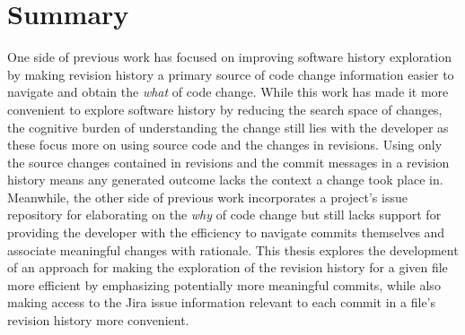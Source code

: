 \section{Summary}

One side of previous work has focused on improving software history exploration by making revision history a primary source of code change information easier to navigate and obtain the \emph{what} of code change.
While this work has made it more convenient to explore software history by reducing the search space of changes, the cognitive burden of understanding the change still lies with the developer as these focus more on using source code and the changes in revisions.
Using only the source changes contained in revisions and the commit messages in a revision history means any generated outcome lacks the context a change took place in.
Meanwhile, the other side of previous work incorporates a project's issue repository for elaborating on the \emph{why} of code change but still lacks support for providing the developer with the efficiency to navigate commits themselves and associate meaningful changes with rationale.
This thesis explores the development of an approach for making the exploration of the revision history for a given file more efficient by emphasizing potentially more meaningful commits, while also making access to the Jira issue information relevant to each commit in a file's revision history more convenient.

\endinput

Any text after an \endinput is ignored.
You could put scraps here or things in progress.